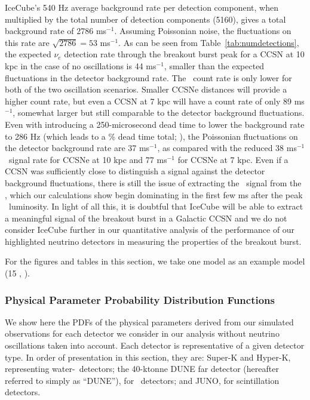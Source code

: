 IceCube's 540 Hz average background rate per detection component, when 
    multiplied by the total number of detection components (5160), gives a total 
    background rate of 2786 ms$^{-1}$.  Assuming Poissonian noise, the fluctuations
    on this rate are $\sqrt{2786} = 53$ ms$^{-1}$.  As can be seen from Table~\ref{tab:numdetections}, the 
    expected $\nu_e$ detection rate through the breakout burst peak for a CCSN at 
    10 kpc in the case of no oscillations is 44 ms$^{-1}$, smaller than the expected fluctuations in the detector 
    background rate.  The \nue\ count rate is only lower for both
    of the two oscillation scenarios.  Smaller CCSNe distances will provide a higher count rate,
    but even a CCSN at 7 kpc will have a count rate of only 89 ms$^{-1}$, somewhat 
    larger but still comparable to the detector background fluctuations.  Even with 
    introducing a 250-microsecond dead time to lower the background rate to 
    286 Hz (which leads to a \% dead time total; \citealt{abbasietal2011}), the 
    Poissonian fluctuations on the detector background rate are 37 ms$^{-1}$, as 
    compared with the reduced 38 ms$^{-1}$ \nue\ signal rate for CCSNe at 10 
    kpc and 77 ms$^{-1}$ for CCSNe at 7 kpc.  Even if a CCSN was sufficiently 
    close to distinguish a signal against the detector background fluctuations, there 
    is still the issue of extracting the \nue\ signal from the
    \backgrounds, 
which our calculations show begin dominating in the first few ms 
    after the peak \nue\ luminosity.  In light of all this, it is doubtful that IceCube
    will be able to extract a meaningful signal of the breakout burst in a Galactic
    CCSN and we do not consider IceCube further in our quantitative analysis of the
    performance of our highlighted neutrino detectors in measuring the properties of the
    breakout burst.


For the figures and tables in this section, 
we take one model as an example model (15 \Msol, \ls).


\subsubsection{Physical Parameter Probability Distribution Functions}

We show here the PDFs of the
physical parameters derived from our simulated observations for each
detector we consider in our analysis without neutrino oscillations
taken into account.  Each detector is representative
of a given detector type.  In order of presentation in this section,
they are: Super-K and
Hyper-K, representing water-\cer\ detectors; the 40-ktonne DUNE far
detector (hereafter referred to simply as ``DUNE''), 
for \ detectors; and JUNO, for scintillation detectors.


